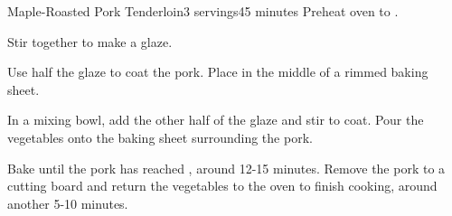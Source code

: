 \documentclass[../Cookbook.tex]{subfiles}
\begin{document}
\begin{recipe}[MapleRoastedPorkTenderloin]{Maple-Roasted Pork Tenderloin}{3 servings}{45 minutes}
Preheat oven to .

Stir together to make a glaze.

Use half the glaze to coat the pork. 
Place in the middle of a rimmed baking sheet.

In a mixing bowl, add the other half of the glaze and stir to coat.
Pour the vegetables onto the baking sheet surrounding the pork.

Bake until the pork has reached , around 12-15 minutes.
Remove the pork to a cutting board and return the vegetables to the oven to finish cooking, around another 5-10 minutes. 

\end{recipe}
\end{document}
